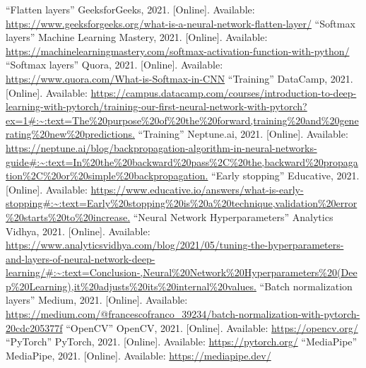 \documentclass[../paper.tex]{subfiles}
\begin{document}
\begin{thebibliography}{00}
         ``Flatten layers'' GeeksforGeeks, 2021.
        [Online].
        Available: \url{https://www.geeksforgeeks.org/what-is-a-neural-network-flatten-layer/}
         ``Softmax layers'' Machine Learning Mastery, 2021.
        [Online].
        Available: \url{https://machinelearningmastery.com/softmax-activation-function-with-python/}
         ``Softmax layers'' Quora, 2021.
        [Online].
        Available: \url{https://www.quora.com/What-is-Softmax-in-CNN}
         ``Training'' DataCamp, 2021.
        [Online].
        Available: \url{https://campus.datacamp.com/courses/introduction-to-deep-learning-with-pytorch/training-our-first-neural-network-with-pytorch?ex=1#:~:text=The%20purpose%20of%20the%20forward,training%20and%20generating%20new%20predictions.}
         ``Training'' Neptune.ai, 2021.
        [Online].
        Available: \url{https://neptune.ai/blog/backpropagation-algorithm-in-neural-networks-guide#:~:text=In%20the%20backward%20pass%2C%20the,backward%20propagation%2C%20or%20simple%20backpropagation.}
         ``Early stopping'' Educative, 2021.
        [Online].
        Available: \url{https://www.educative.io/answers/what-is-early-stopping#:~:text=Early%20stopping%20is%20a%20technique,validation%20error%20starts%20to%20increase.}
         ``Neural Network Hyperparameters'' Analytics Vidhya, 2021.
        [Online].
        Available: \url{https://www.analyticsvidhya.com/blog/2021/05/tuning-the-hyperparameters-and-layers-of-neural-network-deep-learning/#:~:text=Conclusion-,Neural%20Network%20Hyperparameters%20(Deep%20Learning),it%20adjusts%20its%20internal%20values.}
         ``Batch normalization layers'' Medium, 2021.
        [Online].
        Available: \url{https://medium.com/@francescofranco_39234/batch-normalization-with-pytorch-20cdc205377f}
         ``OpenCV'' OpenCV, 2021.
        [Online].
        Available: \url{https://opencv.org/}
         ``PyTorch'' PyTorch, 2021.
        [Online].
        Available: \url{https://pytorch.org/}
         ``MediaPipe'' MediaPipe, 2021.
        [Online].
        Available: \url{https://mediapipe.dev/}
    \end{thebibliography}
\end{document}
